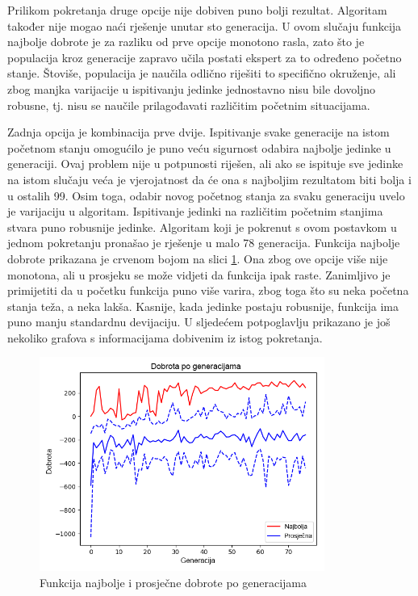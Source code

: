 \documentclass[times, utf8, diplomski, numeric]{fer}
\begin{document}
Prilikom pokretanja druge opcije nije dobiven puno bolji rezultat. Algoritam također nije mogao naći rješenje unutar sto generacija. U ovom slučaju funkcija najbolje dobrote je za razliku od prve opcije monotono rasla, zato što je populacija kroz generacije zapravo učila postati ekspert za to određeno početno stanje. Štoviše, populacija je naučila odlično riješiti to specifično okruženje, ali zbog manjka varijacije u ispitivanju jedinke jednostavno nisu bile dovoljno robusne, tj. nisu se naučile prilagođavati različitim početnim situacijama.

Zadnja opcija je kombinacija prve dvije. Ispitivanje svake generacije na istom početnom stanju omogućilo je puno veću sigurnost odabira najbolje jedinke u generaciji. Ovaj problem nije u potpunosti riješen, ali ako se ispituje sve jedinke na istom slučaju veća je vjerojatnost da će ona s najboljim rezultatom biti bolja i u ostalih 99. Osim toga, odabir novog početnog stanja za svaku generaciju uvelo je varijaciju u algoritam. Ispitivanje jedinki na različitim početnim stanjima stvara puno robusnije jedinke. Algoritam koji je pokrenut s ovom postavkom u jednom pokretanju pronašao je rješenje u malo 78 generacija. Funkcija najbolje dobrote prikazana je crvenom bojom na slici \ref{slika13}. Ona zbog ove opcije više nije monotona, ali u prosjeku se može vidjeti da funkcija ipak raste. Zanimljivo je primijetiti da u početku funkcija puno više varira, zbog toga što su neka početna stanja teža, a neka lakša. Kasnije, kada jedinke postaju robusnije, funkcija ima puno manju standardnu devijaciju. U sljedećem potpoglavlju prikazano je još nekoliko grafova s informacijama dobivenim iz istog pokretanja.

\begin{figure}
  \centering
  \includegraphics[height=7cm]{slika13}
  \caption{Funkcija najbolje i prosječne dobrote po generacijama}
  \label{slika13}
\end{figure}
\end{document}
